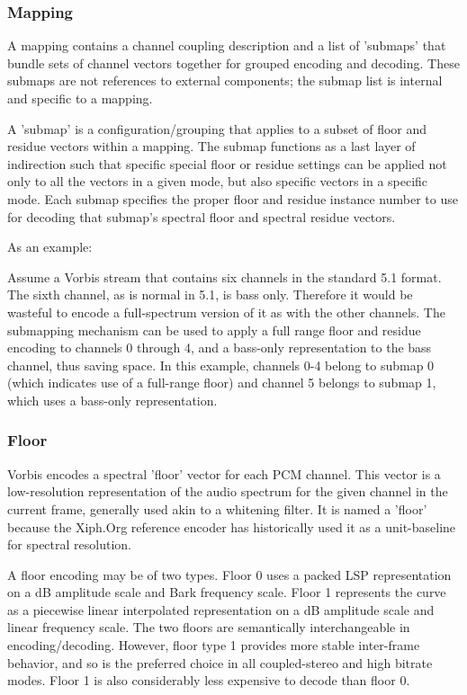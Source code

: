 \subsubsection{Mapping}

A mapping contains a channel coupling description and a list of
'submaps' that bundle sets of channel vectors together for grouped
encoding and decoding. These submaps are not references to external
components; the submap list is internal and specific to a mapping.

A 'submap' is a configuration/grouping that applies to a subset of
floor and residue vectors within a mapping.  The submap functions as a
last layer of indirection such that specific special floor or residue
settings can be applied not only to all the vectors in a given mode,
but also specific vectors in a specific mode.  Each submap specifies
the proper floor and residue instance number to use for decoding that
submap's spectral floor and spectral residue vectors.

As an example:

Assume a Vorbis stream that contains six channels in the standard 5.1
format.  The sixth channel, as is normal in 5.1, is bass only.
Therefore it would be wasteful to encode a full-spectrum version of it
as with the other channels.  The submapping mechanism can be used to
apply a full range floor and residue encoding to channels 0 through 4,
and a bass-only representation to the bass channel, thus saving space.
In this example, channels 0-4 belong to submap 0 (which indicates use
of a full-range floor) and channel 5 belongs to submap 1, which uses a
bass-only representation.


\subsubsection{Floor}

Vorbis encodes a spectral 'floor' vector for each PCM channel.  This
vector is a low-resolution representation of the audio spectrum for
the given channel in the current frame, generally used akin to a
whitening filter.  It is named a 'floor' because the Xiph.Org
reference encoder has historically used it as a unit-baseline for
spectral resolution.

A floor encoding may be of two types.  Floor 0 uses a packed LSP
representation on a dB amplitude scale and Bark frequency scale.
Floor 1 represents the curve as a piecewise linear interpolated
representation on a dB amplitude scale and linear frequency scale.
The two floors are semantically interchangeable in
encoding/decoding. However, floor type 1 provides more stable
inter-frame behavior, and so is the preferred choice in all
coupled-stereo and high bitrate modes.  Floor 1 is also considerably
less expensive to decode than floor 0.


